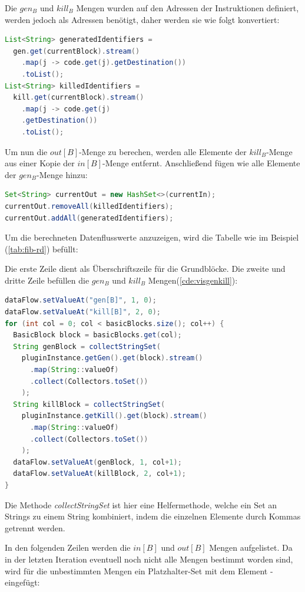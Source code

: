 Die $gen_B$ und $kill_B$ Mengen wurden auf den Adressen der Instruktionen definiert,
werden jedoch als Adressen benötigt, daher werden sie wie folgt konvertiert:

\begin{lstlisting}[language=Java, caption={Konvertierung der $gen$-Menge}, label={cde:genConv}]
List<String> generatedIdentifiers = 
  gen.get(currentBlock).stream()
    .map(j -> code.get(j).getDestination())
    .toList();
List<String> killedIdentifiers = 
  kill.get(currentBlock).stream()
    .map(j -> code.get(j)
    .getDestination())
    .toList();
\end{lstlisting}

Um nun die $out[B]$-Menge zu berechen, werden alle Elemente der $kill_B$-Menge aus
einer Kopie der $in[B]$-Menge entfernt. Anschließend fügen wie alle Elemente der
$gen_B$-Menge hinzu:
\begin{lstlisting}[language=Java, caption={Berechnung der $out$-Menge}, label={cde:rdOut}]
Set<String> currentOut = new HashSet<>(currentIn);
currentOut.removeAll(killedIdentifiers);
currentOut.addAll(generatedIdentifiers);
\end{lstlisting}

Um die berechneten Datenflusswerte anzuzeigen, wird die Tabelle 
wie im Beispiel (\cref{tab:fib-rd}) befüllt:

Die erste Zeile dient als Überschriftszeile für die Grundblöcke.
Die zweite und dritte Zeile befüllen die $gen_B$ und $kill_B$ Mengen(\cref{cde:visgenkill}):
\begin{lstlisting}[language=Java, caption={Berechnung der $out$-Menge}, label={cde:visgenkill}]
dataFlow.setValueAt("gen[B]", 1, 0);
dataFlow.setValueAt("kill[B]", 2, 0);
for (int col = 0; col < basicBlocks.size(); col++) {
  BasicBlock block = basicBlocks.get(col);
  String genBlock = collectStringSet(
    pluginInstance.getGen().get(block).stream()
      .map(String::valueOf)
      .collect(Collectors.toSet())
    );
  String killBlock = collectStringSet(
    pluginInstance.getKill().get(block).stream()
      .map(String::valueOf)
      .collect(Collectors.toSet())
    );
  dataFlow.setValueAt(genBlock, 1, col+1);
  dataFlow.setValueAt(killBlock, 2, col+1);
}
\end{lstlisting}
Die Methode \textit{collectStringSet} ist hier eine Helfermethode, welche ein
Set an Strings zu einem String kombiniert, indem die einzelnen Elemente durch Kommas getrennt werden.

In den folgenden Zeilen werden die $in[B]$ und $out[B]$ Mengen aufgelistet.
Da in der letzten Iteration eventuell noch nicht alle Mengen bestimmt worden sind, 
wird für die unbestimmten Mengen ein Platzhalter-Set mit dem Element \glqq -\grqq  eingefügt:

